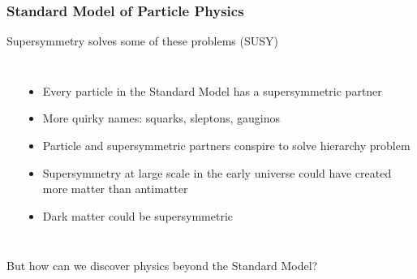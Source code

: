 \begin{frame}[t]
 \frametitle{Standard Model of Particle Physics}
 \begin{block}{Supersymmetry solves some of these problems (SUSY)}
  \begin{columns}[T]
    \begin{center}
    \end{center}
    \begin{itemize}
     \item Every particle in the Standard Model has a \alert{supersymmetric partner}
     \item More quirky names: squarks, sleptons, gauginos
     \item Particle and supersymmetric partners conspire to solve hierarchy problem
     \item Supersymmetry at large scale in the early universe could have created more matter than antimatter
     \item Dark matter could be supersymmetric
    \end{itemize}
  \end{columns}
 \end{block}
 \vfill
 \begin{center}
  \alert{But how can we discover physics beyond the Standard Model?}
 \end{center}
\end{frame}
